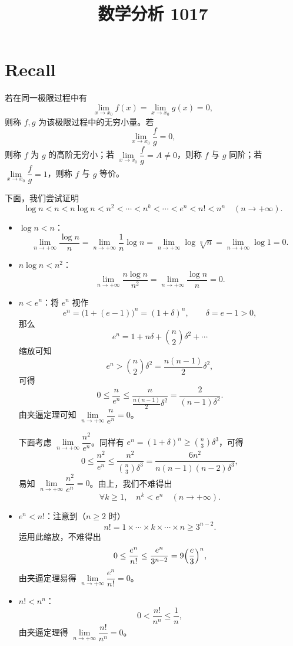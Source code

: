 \documentclass[UTF8,11pt]{ctexart}
\title{数学分析 1017}
\date{}
\theoremstyle{cnthm}
\begin{document}
\maketitle

\section{Recall}

若在同一极限过程中有
\[
\lim_{x\to x_0}f(x)=\lim_{x\to x_0}g(x)=0,
\]
则称 $f,g$ 为该极限过程中的无穷小量。若
\[
\lim_{x\to x_0}\frac{f}{g}=0,
\]
则称 $f$ 为 $g$ 的高阶无穷小；若 $\lim\limits_{x\to x_0}\dfrac{f}{g}=A\neq 0$，则称 $f$ 与 $g$ 同阶；若 $\lim\limits_{x\to x_0}\dfrac{f}{g}=1$，则称 $f$ 与 $g$ 等价。

下面，我们尝试证明
\[
\log n<n<n\log n<n^2<\cdots<n^k<\cdots<e^n<n!<n^n
\quad(n\to+\infty).
\]

\begin{itemize}
\item $\log n<n$：
\[
\lim_{n\to+\infty}\frac{\log n}{n}
=\lim_{n\to+\infty}\frac{1}{n}\log n
=\lim_{n\to+\infty}\log\sqrt[n]{n}
=\lim_{n\to+\infty}\log 1=0.
\]

\item $n\log n<n^2$：
\[
\lim_{n\to+\infty}\frac{n\log n}{n^2}
=\lim_{n\to+\infty}\frac{\log n}{n}=0.
\]

\item $n<e^n$：将 $e^n$ 视作
\[
e^n=\bigl(1+(e-1)\bigr)^n=(1+\delta)^n,\qquad \delta=e-1>0,
\]
那么
\[
e^n=1+n\delta+\binom{n}{2}\delta^2+\cdots
\]
缩放可知
\[
e^n>\binom{n}{2}\delta^2=\frac{n(n-1)}{2}\delta^2,
\]
可得
\[
0\le\frac{n}{e^n}\le\frac{n}{\frac{n(n-1)}{2}\delta^2}=\frac{2}{(n-1)\delta^2}.
\]
由夹逼定理可知 $\lim\limits_{n\to+\infty}\dfrac{n}{e^n}=0$。

下面考虑 $\lim\limits_{n\to+\infty}\dfrac{n^2}{e^n}$。同样有 $e^n=(1+\delta)^n\ge\binom{n}{3}\delta^3$，可得
\[
0\le\frac{n^2}{e^n}\le\frac{n^2}{\binom{n}{3}\delta^3}
=\frac{6n^2}{n(n-1)(n-2)\delta^3},
\]
易知 $\lim\limits_{n\to+\infty}\dfrac{n^2}{e^n}=0$。由上，我们不难得出
\[
\forall k\ge 1,\quad n^k<e^n\quad(n\to+\infty).
\]

\item $e^n<n!$：注意到（$n\ge 2$ 时）
\[
n!=1\times\cdots\times k\times\cdots\times n\ge 3^{n-2}.
\]
运用此缩放，不难得出
\[
0\le\frac{e^n}{n!}\le\frac{e^n}{3^{n-2}}=9\Bigl(\frac{e}{3}\Bigr)^n,
\]
由夹逼定理易得 $\lim\limits_{n\to+\infty}\dfrac{e^n}{n!}=0$。

\item $n!<n^n$：
\[
0<\frac{n!}{n^n}\le\frac{1}{n},
\]
由夹逼定理得 $\lim\limits_{n\to+\infty}\dfrac{n!}{n^n}=0$。
\end{itemize}
\end{document}
